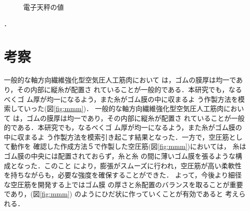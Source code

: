 \begin{figure}[h]
\begin{minipage}{0.49\columnwidth}
    \caption{電子天秤の値}
    \label{fig:138}
  \end{minipage}
\end{figure}．

\newpage
\section{考察}
一般的な軸方向繊維強化型空気圧人工筋肉において
は，ゴムの膜厚は均一であり，その内部に縦糸が配置さ
れていることが一般的である．本研究でも，なるべくゴ
ム厚が均一になるよう，また糸がゴム膜の中に収まるよ
う作製方法を模索していった(図\ref{fig:mmm})．
一般的な軸方向繊維強化型空気圧人工筋肉において
は，ゴムの膜厚は均一であり，その内部に縦糸が配置さ
れていることが一般的である．本研究でも，なるべくゴ
ム厚が均一になるよう，また糸がゴム膜の中に収まるよ
う作製方法を模索引き起こす結果となった．一方で，空圧筋として動作を
確認した作成方法５で作製した空圧筋(図\ref{fig:mmm})においては，
糸はゴム膜の中央には配置されておらず，糸と糸
の間に薄いゴム膜を張るような構成となった．このこと
により，膨張がスムーズに行われ，空圧筋が高い柔軟性
を持ちながらも，必要な強度を確保することができた．
よって，今後より細径な空圧筋を開発する上ではゴム膜
の厚さと糸配置のバランスを取ることが重要であり，(図\ref{fig:mmm})
のようにひだ状に作っていくことが有効であると
考えられる．
